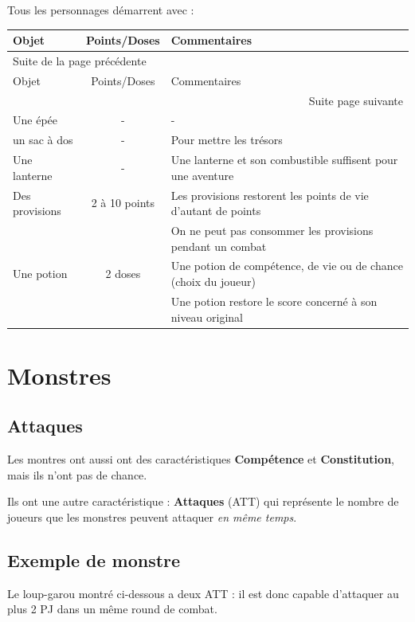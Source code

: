 \documentclass[a4paper, 11pt, twoside]{article}
\begin{document}
Tous les personnages démarrent avec :

\begin{longtable}{l|c|l}
Objet & Points/Doses & Commentaires\\
\hline
\endfirsthead
\multicolumn{3}{l}{Suite de la page précédente} \\
\hline

Objet & Points/Doses & Commentaires \\

\hline
\endhead
\hline\multicolumn{3}{r}{Suite page suivante} \\
\endfoot
\endlastfoot
\hline
Une épée & - & -\\
un sac à dos & - & Pour mettre les trésors\\
Une lanterne & - & Une lanterne et son combustible suffisent pour une aventure\\
Des provisions & 2 à 10 points & Les provisions restorent les points de vie d'autant de points\\
 &  & On ne peut pas consommer les provisions pendant un combat\\
Une potion & 2 doses & Une potion de compétence, de vie ou de chance (choix du joueur)\\
 &  & Une potion restore le score concerné à son niveau original\\
\end{longtable}

\section{Monstres}
\label{sec:orgd710bfb}

\subsection{Attaques}
\label{sec:org6b447b1}

Les montres ont aussi ont des caractéristiques \textbf{Compétence} et \textbf{Constitution}, mais ils n'ont pas de chance.

Ils ont une autre caractéristique : \textbf{Attaques} (ATT) qui représente le nombre de joueurs que les monstres peuvent attaquer \emph{en même temps}.

\subsection{Exemple de monstre}
\label{sec:org3c37c77}

Le loup-garou montré ci-dessous a deux ATT : il est donc capable d'attaquer au plus 2 PJ dans un même round de combat.
\end{document}
